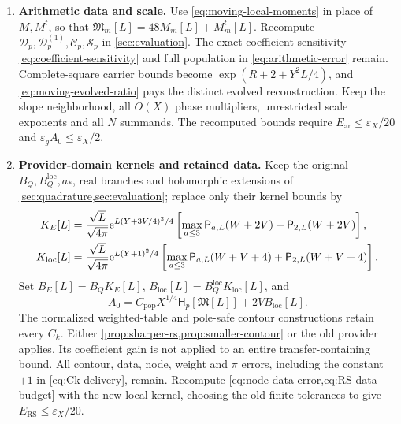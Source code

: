 \begin{enumerate}[leftmargin=*,itemsep=.55em]
\item \textbf{Arithmetic data and scale.}
Use \eqref{eq:moving-local-moments} in place of \(M,M^t\), so that
\(\mathfrak M_m[L]=48M_m[L]+M_m^t[L]\).
Recompute \(\mathcal D_p,\mathcal D_p^{(1)},\mathcal C_p,
\mathcal S_p\) in \cref{sec:evaluation}. The exact coefficient
sensitivity \eqref{eq:coefficient-sensitivity} and full population
in \eqref{eq:arithmetic-error} remain. Complete-square carrier bounds
become \(\exp(R+2+Y^2L/4)\), and
\eqref{eq:moving-evolved-ratio} pays the distinct evolved reconstruction.
Keep the slope neighborhood, all \(O(X)\) phase multipliers, unrestricted
scale exponents and all \(N\) summands. The recomputed bounds require
\(E_{\mathrm{ar}}\le\varepsilon_X/20\) and
\(\varepsilon_gA_0\le\varepsilon_X/2\).

\item \textbf{Provider-domain kernels and retained data.}
Keep the original \(B_Q,B_Q^{\mathrm{loc}},a_*\), real branches and
holomorphic extensions of \cref{sec:quadrature,sec:evaluation}; replace only
their kernel bounds by
\begin{subequations}\label{eq:moving-provider-kernels}
\begin{align}
 K_E[L]&=\frac{\sqrt L}{\sqrt{4\pi}}
       \mathrm e^{L(Y+3V/4)^2/4}
       \left[\max_{a\le3}\mathsf P_{a,L}(W+2V)
                           +\mathsf P_{2,L}(W+2V)\right],\\
 K_{\mathrm{loc}}[L]&=\frac{\sqrt L}{\sqrt{4\pi}}
       \mathrm e^{L(Y+1)^2/4}
       \left[\max_{a\le3}\mathsf P_{a,L}(W+V+4)
                           +\mathsf P_{2,L}(W+V+4)\right].
\end{align}
\end{subequations}
Set \(B_E[L]=B_QK_E[L]\),
\(B_{\mathrm{loc}}[L]=B_Q^{\mathrm{loc}}K_{\mathrm{loc}}[L]\), and
\[
 A_0=C_{\mathrm{pop}}X^{1/4}\mathsf H_p[\mathfrak M[L]]
                            +2VB_{\mathrm{loc}}[L].
\]
The normalized weighted-table and pole-safe contour constructions retain
every \(C_k\). Either \cref{prop:sharper-rs,prop:smaller-contour} or the
old provider applies. Its coefficient gain is not applied to an entire
transfer-containing bound. All contour, data, node, weight and \(\pi\)
errors, including the constant \(+1\) in \eqref{eq:Ck-delivery}, remain.
Recompute \cref{eq:node-data-error,eq:RS-data-budget} with the new local
kernel, choosing the old finite tolerances to give
\(E_{\mathrm{RS}}\le\varepsilon_X/20\).


\end{enumerate}
